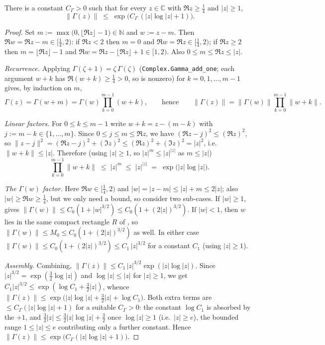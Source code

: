 \begin{lemma}
\label{lem:xo_gamma_halfplane}
\leanok
{}
There is a constant $C_\Gamma>0$ such that for every $z\in\mathbb C$ with
$\Re z\ge\tfrac14$ and $|z|\ge1$,
\[
  \|\Gamma(z)\|\;\le\;\exp\!\bigl(C_\Gamma\,(|z|\log|z|+1)\bigr).
\]
\end{lemma}

\begin{proof}
\leanok
{}
Set $m:=\max\bigl(0,\lfloor\Re z\rfloor-1\bigr)\in\mathbb N$ and $w:=z-m$. Then
$\Re w=\Re z-m\in[\tfrac14,2)$: if $\Re z<2$ then $m=0$ and $\Re w=\Re z\in[\tfrac14,2)$;
if $\Re z\ge2$ then $m=\lfloor\Re z\rfloor-1$ and
$\Re w=\Re z-\lfloor\Re z\rfloor+1\in[1,2)$. Also $0\le m\le\Re z\le|z|$.

\emph{Recurrence.} Applying $\Gamma(\zeta+1)=\zeta\,\Gamma(\zeta)$
(\texttt{Complex.Gamma\_add\_one}; each argument $w+k$ has $\Re(w+k)\ge\tfrac14>0$, so is
nonzero) for $k=0,1,\dots,m-1$ gives, by induction on $m$,
\[
  \Gamma(z)=\Gamma(w+m)=\Gamma(w)\prod_{k=0}^{m-1}(w+k),
  \qquad\text{hence}\qquad
  \|\Gamma(z)\|=\|\Gamma(w)\|\prod_{k=0}^{m-1}\|w+k\|.
\]

\emph{Linear factors.} For $0\le k\le m-1$ write $w+k=z-(m-k)$ with
$j:=m-k\in\{1,\dots,m\}$. Since $0\le j\le m\le\Re z$, we have
$(\Re z-j)^2\le(\Re z)^2$, so $\|z-j\|^2=(\Re z-j)^2+(\Im z)^2\le(\Re z)^2+(\Im z)^2=|z|^2$,
i.e.\ $\|w+k\|\le|z|$. Therefore (using $|z|\ge1$, so $|z|^m\le|z|^{|z|}$ as $m\le|z|$)
\[
  \prod_{k=0}^{m-1}\|w+k\|\;\le\;|z|^{m}\;\le\;|z|^{|z|}\;=\;\exp\bigl(|z|\log|z|\bigr).
\]

\emph{The $\Gamma(w)$ factor.} Here $\Re w\in[\tfrac14,2)$ and $|w|=|z-m|\le|z|+m\le2|z|$;
also $|w|\ge\Re w\ge\tfrac14$, but we only need a bound, so consider two sub-cases. If
$|w|\ge1$,  gives
$\|\Gamma(w)\|\le C_0(1+|w|^{3/2})\le C_0(1+(2|z|)^{3/2})$. If $|w|<1$, then $w$ lies in
the same compact rectangle $R$ of , so
$\|\Gamma(w)\|\le M_0\le C_0(1+(2|z|)^{3/2})$ as well. In either case
$\|\Gamma(w)\|\le C_0(1+(2|z|)^{3/2})\le C_1\,|z|^{3/2}$ for a constant $C_1$ (using
$|z|\ge1$).

\emph{Assembly.} Combining,
$\|\Gamma(z)\|\le C_1\,|z|^{3/2}\exp(|z|\log|z|)$. Since $|z|^{3/2}=\exp(\tfrac32\log|z|)$
and $\log|z|\le|z|$ for $|z|\ge1$, we get
$C_1|z|^{3/2}\le\exp(\log C_1+\tfrac32|z|)$, whence
$\|\Gamma(z)\|\le\exp\bigl(|z|\log|z|+\tfrac32|z|+\log C_1\bigr)$. Both extra terms are
$\le C_\Gamma(|z|\log|z|+1)$ for a suitable $C_\Gamma>0$: the constant $\log C_1$ is
absorbed by the $+1$, and $\tfrac32|z|\le\tfrac32 |z|\log|z|+\tfrac32$ once $\log|z|\ge1$
(i.e.\ $|z|\ge e$), the bounded range $1\le|z|\le e$ contributing only a further
constant. Hence $\|\Gamma(z)\|\le\exp\bigl(C_\Gamma(|z|\log|z|+1)\bigr)$.
\end{proof}

